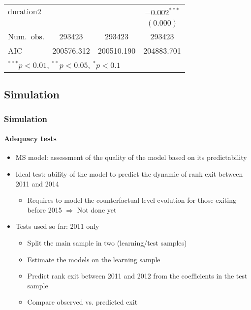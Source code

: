 \documentclass[xcolor=table,ignorenonframetext,12pt]{beamer}
\newenvironment{choixmarges}[2]{\begin{list}{}{%
\setlength{\topsep}{0pt}%
\setlength{\leftmargin}{0pt}%
\setlength{\rightmargin}{0pt}%
\setlength{\listparindent}{\parindent}%
\setlength{\itemindent}{\parindent}%
\setlength{\parsep}{0pt plus 1pt}%
\addtolength{\leftmargin}{#1}%
\addtolength{\rightmargin}{#2}%
}\item }{\end{list}}
\begin{document}
\begin{frame}
\begin{choixmarges}{-0.5cm}{-0.5cm}
\begin{table}
\begin{center}
{\begin{tabular}{l c c c }
duration2      &               &                & $-0.002^{***}$ \\
               &               &                & $(0.000)$      \\
\midrule
Num.\ obs.     & 293423        & 293423         & 293423         \\
AIC            & 200576.312    & 200510.190     & 204883.701     \\
\bottomrule
\multicolumn{4}{l}{\scriptsize{$^{***}p<0.01$, $^{**}p<0.05$, $^*p<0.1$}}
\end{tabular}}
\end{center}
\end{table}


\end{choixmarges}

\end{frame}



\subsection{Simulation}

\begin{frame}
\frametitle{Simulation}
\framesubtitle{Adequacy tests}
\begin{choixmarges}{-0.5cm}{-0.5cm}


\begin{itemize}

\item MS model: assessment of the quality of the model based on its predictability
\vspace{0.2cm}

\item Ideal test: ability of the model to predict the dynamic of rank exit between 2011 and 2014
	\begin{itemize}
	\item Requires to model the counterfactual level evolution for those exiting before 2015
	$\Rightarrow$ Not done yet
	\end{itemize}
\vspace{0.2cm}

\item Tests used so far: 2011 only
	\begin{itemize}
\item Split the main sample in two (learning/test samples)
\item Estimate the models on the learning sample 
\item Predict rank exit between 2011 and 2012 from the coefficients in the test sample
\item Compare observed vs. predicted exit
	\end{itemize}

\end{itemize}
\end{choixmarges}

\end{frame}
\end{document}
